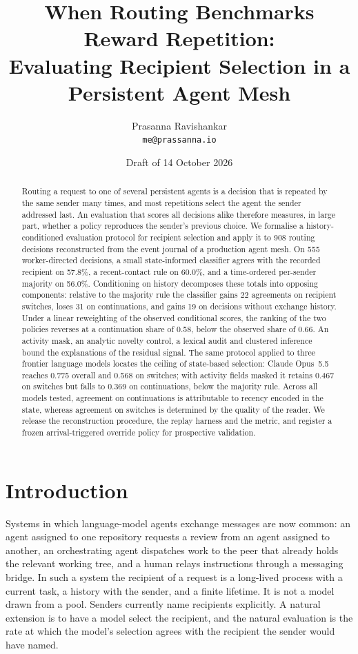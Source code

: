 \documentclass[11pt]{article}
\title{When Routing Benchmarks Reward Repetition:\\
\large Evaluating Recipient Selection in a Persistent Agent Mesh}
\author{Prasanna Ravishankar\\
\small \texttt{me@prassanna.io}
\todo{affiliation; co-author line}}
\date{Draft of 14 October 2026}
\theoremstyle{definition}
\begin{document}
\maketitle

\begin{abstract}
Routing a request to one of several persistent agents is a decision that is repeated by the same sender many times, and most repetitions select the agent the sender addressed last. An evaluation that scores all decisions alike therefore measures, in large part, whether a policy reproduces the sender's previous choice. We formalise a history-conditioned evaluation protocol for recipient selection and apply it to 908 routing decisions reconstructed from the event journal of a production agent mesh. On 555 worker-directed decisions, a small state-informed classifier agrees with the recorded recipient on 57.8\%, a recent-contact rule on 60.0\%, and a time-ordered per-sender majority on 56.0\%. Conditioning on history decomposes these totals into opposing components: relative to the majority rule the classifier gains 22 agreements on recipient switches, loses 31 on continuations, and gains 19 on decisions without exchange history. Under a linear reweighting of the observed conditional scores, the ranking of the two policies reverses at a continuation share of 0.58, below the observed share of 0.66. An activity mask, an analytic novelty control, a lexical audit and clustered inference bound the explanations of the residual signal. The same protocol applied to three frontier language models locates the ceiling of state-based selection: Claude Opus~5.5 reaches 0.775 overall and 0.568 on switches; with activity fields masked it retains 0.467 on switches but falls to 0.369 on continuations, below the majority rule. Across all models tested, agreement on continuations is attributable to recency encoded in the state, whereas agreement on switches is determined by the quality of the reader. We release the reconstruction procedure, the replay harness and the metric, and register a frozen arrival-triggered override policy for prospective validation.
\end{abstract}

\section{Introduction}

Systems in which language-model agents exchange messages are now common: an agent assigned to one repository requests a review from an agent assigned to another, an orchestrating agent dispatches work to the peer that already holds the relevant working tree, and a human relays instructions through a messaging bridge. In such a system the recipient of a request is a long-lived process with a current task, a history with the sender, and a finite lifetime. It is not a model drawn from a pool. Senders currently name recipients explicitly. A natural extension is to have a model select the recipient, and the natural evaluation is the rate at which the model's selection agrees with the recipient the sender would have named.
\end{document}
